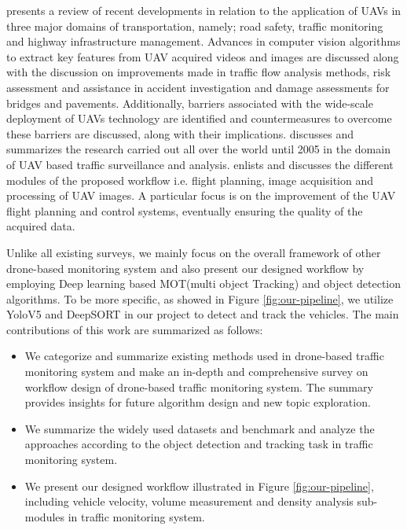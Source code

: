 \documentclass[10pt,twocolumn,letterpaper]{article}  %
\begin{document}
\cite{outay2020applications} presents a review of recent developments in relation to the application of UAVs in three major domains of transportation, namely; road safety, traffic monitoring and highway infrastructure management. Advances in computer vision algorithms to extract key features from UAV acquired videos and images are discussed along with the discussion on improvements made in traffic flow analysis methods, risk assessment and assistance in accident investigation and damage assessments for bridges and pavements. Additionally, barriers associated with the wide-scale deployment of UAVs technology are identified and countermeasures to overcome these barriers are discussed, along with their implications. 
\cite{puri2005survey} discusses and summarizes the research carried out all over the world until 2005 in the domain of UAV based traffic surveillance and analysis. \cite{heintz2007images} enlists and discusses the different modules of the proposed workflow i.e. flight planning, image acquisition and processing of UAV images. A particular focus is on the improvement of the UAV flight planning and control systems, eventually ensuring the quality of the acquired data. 


Unlike all existing surveys, we mainly focus on the overall framework of other drone-based monitoring system and also present our designed workflow by employing Deep learning based MOT(multi object Tracking) and object detection algorithms. To be more specific, as showed in Figure \ref{fig:our-pipeline}, we utilize YoloV5 \cite{github_yolov5} and DeepSORT \cite{wojke2017simple} in our project to detect and track the vehicles. The main contributions of this work are summarized as follows:
\begin{itemize}
	\item We categorize and summarize existing methods used in drone-based traffic monitoring system and make an in-depth and comprehensive survey on workflow design of drone-based traffic monitoring system. The summary provides insights for future algorithm design and new topic exploration.
	
	\item We summarize the widely used datasets and benchmark and analyze the approaches according to the object detection and tracking task in traffic monitoring system.
	
	\item We present our designed workflow illustrated in Figure \ref{fig:our-pipeline}, including vehicle velocity, volume measurement and density analysis sub-modules in traffic monitoring system.
\end{itemize}
\end{document}
